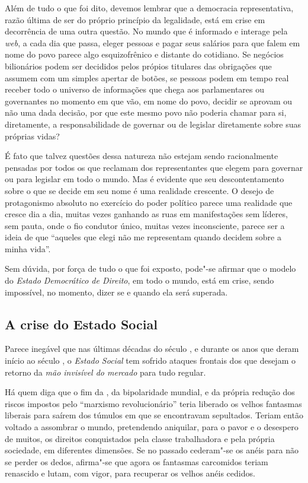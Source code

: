 Além de tudo o que foi dito, devemos lembrar que a democracia
representativa, razão última de ser do próprio princípio da legalidade,
está em crise em decorrência de uma outra questão. No mundo que é
informado e interage pela \emph{web}, a cada dia que passa, eleger
pessoas e pagar seus salários para que falem em nome do povo parece
algo esquizofrênico e distante do cotidiano. Se negócios bilionários
podem ser decididos pelos própios titulares das obrigações que assumem
com um simples apertar de botões, se pessoas podem em tempo real receber
todo o universo de informações que chega aos parlamentares ou
governantes no momento em que vão, em nome do povo, decidir se aprovam
ou não uma dada decisão, por que este mesmo povo não poderia chamar para
si, diretamente, a responsabilidade de governar ou de legislar
diretamente sobre suas próprias vidas?

É fato que talvez questões dessa natureza não estejam sendo
racionalmente pensadas por todos os que reclamam dos representantes que
elegem para governar ou para legislar em todo o mundo. Mas é evidente
que seu descontentamento sobre o que se decide em seu nome é uma
realidade crescente. O desejo de protagonismo absoluto no exercício do
poder político parece uma realidade que cresce dia a dia, muitas vezes
ganhando as ruas em manifestações sem líderes, sem pauta, onde o fio
condutor único, muitas vezes inconsciente, parece ser a ideia de que
``aqueles que elegi não me representam quando decidem sobre a
minha vida''.

Sem dúvida, por força de tudo o que foi exposto, pode"-se afirmar que o
modelo do \emph{Estado Democrático de Direito}, em todo o mundo, está em
crise, sendo impossível, no momento, dizer se e quando ela será
superada.

\subsection{A crise do Estado Social}

Parece inegável que nas últimas décadas do século , e durante os anos
que deram início ao século , o \emph{Estado Social} tem sofrido
ataques frontais dos que desejam o retorno da \emph{mão invisível do
mercado} para tudo regular.

Há quem diga que o fim da , da bipolaridade mundial, e da própria
redução dos riscos impostos pelo ``marxismo revolucionário'' teria
liberado os velhos fantasmas liberais para saírem dos túmulos em que se
encontravam sepultados. Teriam então voltado a assombrar o mundo,
pretendendo aniquilar, para o pavor e o desespero de muitos, os direitos
conquistados pela classe trabalhadora e pela própria sociedade, em
diferentes dimensões. Se no passado cederam"-se os anéis para não se
perder os dedos, afirma"-se que agora os fantasmas carcomidos teriam
renascido e lutam, com vigor, para recuperar os velhos anéis cedidos.

